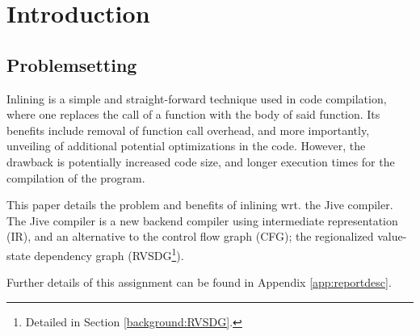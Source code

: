 
\section{Introduction}

\subsection{Problemsetting}


Inlining is a simple and straight-forward technique used in code compilation,
where one replaces the call of a function with the body of said function. Its
benefits include removal of function call overhead, and more importantly,
unveiling of additional potential optimizations in the code. However, the
drawback is potentially increased code size, and longer execution times for the
compilation of the program.

This paper details the problem and benefits of inlining wrt. the Jive  compiler. The Jive compiler is a new backend compiler using
intermediate representation (IR), and an alternative to the control flow graph
(CFG); the regionalized value-state dependency graph (RVSDG\footnote{Detailed in
Section \ref{background:RVSDG}.}).

Further details of this assignment can be found in Appendix
\ref{app:reportdesc}.

